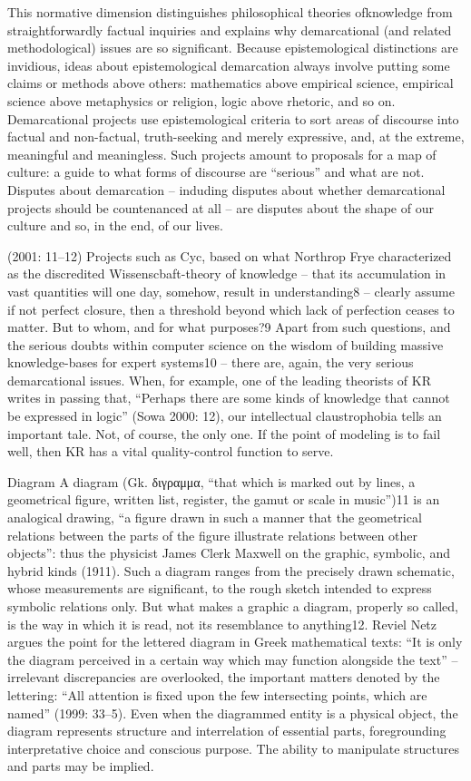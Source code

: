 This normative dimension distinguishes philosophical theories
ofknowledge from straightforwardly factual inquiries and explains why
demarcational (and related methodological) issues are so significant.
Because epistemological distinctions are invidious, ideas about
epistemological demarcation always involve putting some claims or
methods above others: mathematics above empirical science, empirical
science above metaphysics or religion, logic above rhetoric, and so on.
Demarcational projects use epistemological criteria to sort areas of
discourse into factual and non-factual, truth-seeking and merely
expressive, and, at the extreme, meaningful and meaningless. Such
projects amount to proposals for a map of culture: a guide to what forms
of discourse are ``serious'' and what are not. Disputes about
demarcation -- induding disputes about whether demarcational projects
should be countenanced at all -- are disputes about the shape of our
culture and so, in the end, of our lives.

(2001: 11--12) Projects such as Cyc, based on what Northrop Frye
characterized as the discredited Wissenscbaft-theory of knowledge --
that its accumulation in vast quantities will one day, somehow, result
in understanding8 -- clearly assume if not perfect closure, then a
threshold beyond which lack of perfection ceases to matter. But to whom,
and for what purposes?9 Apart from such questions, and the serious
doubts within computer science on the wisdom of building massive
knowledge-bases for expert systems10 -- there are, again, the very
serious demarcational issues. When, for example, one of the leading
theorists of KR writes in passing that, ``Perhaps there are some kinds
of knowledge that cannot be expressed in logic'' (Sowa 2000: 12), our
intellectual claustrophobia tells an important tale. Not, of course, the
only one. If the point of modeling is to fail well, then KR has a vital
quality-control function to serve.

Diagram A diagram (Gk. διγραμμα, ``that which is marked out by lines, a
geometrical figure, written list, register, the gamut or scale in
music'')11 is an analogical drawing, ``a figure drawn in such a manner
that the geometrical relations between the parts of the figure
illustrate relations between other objects'': thus the physicist James
Clerk Maxwell on the graphic, symbolic, and hybrid kinds (1911). Such a
diagram ranges from the precisely drawn schematic, whose measurements
are significant, to the rough sketch intended to express symbolic
relations only. But what makes a graphic a diagram, properly so called,
is the way in which it is read, not its resemblance to anything12.
Reviel Netz argues the point for the lettered diagram in Greek
mathematical texts: ``It is only the diagram perceived in a certain way
which may function alongside the text'' -- irrelevant discrepancies are
overlooked, the important matters denoted by the lettering: ``All
attention is fixed upon the few intersecting points, which are named''
(1999: 33--5). Even when the diagrammed entity is a physical object, the
diagram represents structure and interrelation of essential parts,
foregrounding interpretative choice and conscious purpose. The ability
to manipulate structures and parts may be implied.

